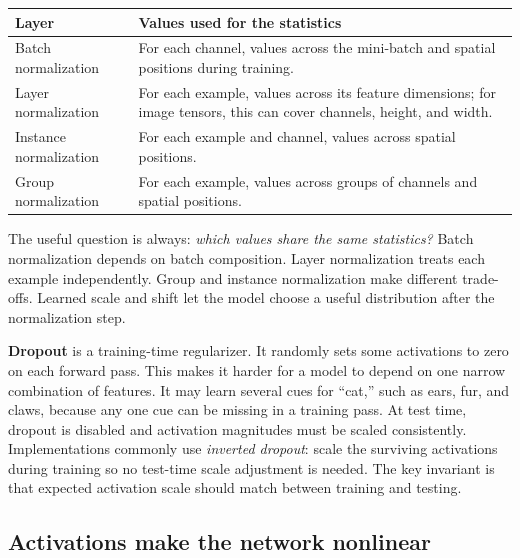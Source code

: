 {\def\LTcaptype{none} %
\begin{longtable}[]{@{}
  >{\raggedright\arraybackslash}p{}
  >{\raggedright\arraybackslash}p{}@{}}
\toprule\noalign{}
\begin{minipage}[b]{\linewidth}\raggedright
Layer
\end{minipage} & \begin{minipage}[b]{\linewidth}\raggedright
Values used for the statistics
\end{minipage} \\
\midrule\noalign{}
\endhead
\bottomrule\noalign{}
\endlastfoot
Batch normalization & For each channel, values across the mini-batch and spatial positions during training. \\
Layer normalization & For each example, values across its feature dimensions; for image tensors, this can cover channels, height, and width. \\
Instance normalization & For each example and channel, values across spatial positions. \\
Group normalization & For each example, values across groups of channels and spatial positions. \\
\end{longtable}
}

The useful question is always: \emph{which values share the same statistics?} Batch normalization depends on batch composition. Layer normalization treats each example independently. Group and instance normalization make different trade-offs. Learned scale and shift let the model choose a useful distribution after the normalization step.

\textbf{Dropout} is a training-time regularizer. It randomly sets some activations to zero on each forward pass. This makes it harder for a model to depend on one narrow combination of features. It may learn several cues for ``cat,'' such as ears, fur, and claws, because any one cue can be missing in a training pass. At test time, dropout is disabled and activation magnitudes must be scaled consistently. Implementations commonly use \emph{inverted dropout}: scale the surviving activations during training so no test-time scale adjustment is needed. The key invariant is that expected activation scale should match between training and testing.

\subsection{Activations make the network nonlinear}\label{04-visual-computing-ii-ch031-activations-make-the-network-nonlinear}

